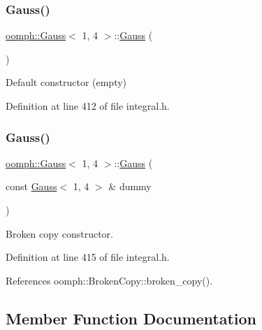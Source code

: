 \subsubsection{\texorpdfstring{Gauss()}{Gauss()}\hspace{0.1cm}{\footnotesize\ttfamily [1/2]}}
{\footnotesize\ttfamily \hyperlink{classoomph_1_1Gauss}{oomph\+::\+Gauss}$<$ 1, 4 $>$\+::\hyperlink{classoomph_1_1Gauss}{Gauss} (\begin{DoxyParamCaption}{ }\end{DoxyParamCaption})\hspace{0.3cm}{\ttfamily [inline]}}



Default constructor (empty) 



Definition at line 412 of file integral.\+h.

\mbox{\label{classoomph_1_1Gauss_3_011_00_014_01_4_a1feee2756c748934ebc8637797e664f7}} 
\subsubsection{\texorpdfstring{Gauss()}{Gauss()}\hspace{0.1cm}{\footnotesize\ttfamily [2/2]}}
{\footnotesize\ttfamily \hyperlink{classoomph_1_1Gauss}{oomph\+::\+Gauss}$<$ 1, 4 $>$\+::\hyperlink{classoomph_1_1Gauss}{Gauss} (\begin{DoxyParamCaption}\item[{const \hyperlink{classoomph_1_1Gauss}{Gauss}$<$ 1, 4 $>$ \&}]{dummy }\end{DoxyParamCaption})\hspace{0.3cm}{\ttfamily [inline]}}



Broken copy constructor. 



Definition at line 415 of file integral.\+h.



References oomph\+::\+Broken\+Copy\+::broken\+\_\+copy().



\subsection{Member Function Documentation}
\mbox{\label{classoomph_1_1Gauss_3_011_00_014_01_4_a8b87ea81fe0a064ea5fecf1c2a20a942}} 
